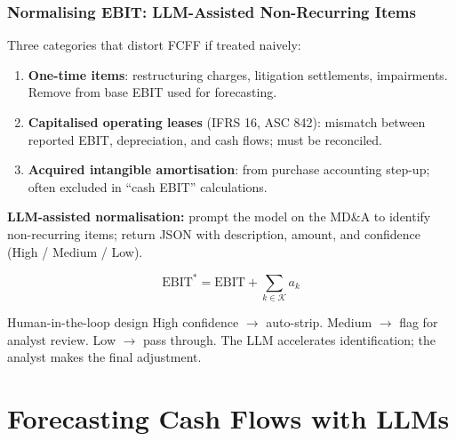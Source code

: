 \documentclass[9pt,t]{beamer}
\begin{document}
\begin{frame}
\frametitle{Normalising EBIT: LLM-Assisted Non-Recurring Items}

Three categories that distort FCFF if treated naively:
\begin{enumerate}
  \item \textbf{One-time items}: restructuring charges, litigation settlements, impairments.
        Remove from base EBIT used for forecasting.
  \item \textbf{Capitalised operating leases} (IFRS 16, ASC 842): mismatch between reported
        EBIT, depreciation, and cash flows; must be reconciled.
  \item \textbf{Acquired intangible amortisation}: from purchase accounting step-up;
        often excluded in ``cash EBIT'' calculations.
\end{enumerate}

\smallskip
\textbf{LLM-assisted normalisation:} prompt the model on the MD\&A to identify non-recurring items;
return JSON with description, amount, and confidence (High / Medium / Low).

\[
  \text{EBIT}^* = \text{EBIT} + \sum_{k \in \mathcal{K}} a_k
\]

\smallskip
\begin{block}{Human-in-the-loop design}
High confidence $\to$ auto-strip. Medium $\to$ flag for analyst review. Low $\to$ pass through.
The LLM accelerates identification; the analyst makes the final adjustment.
\end{block}
\end{frame}

\section{Forecasting Cash Flows with LLMs}
\end{document}
